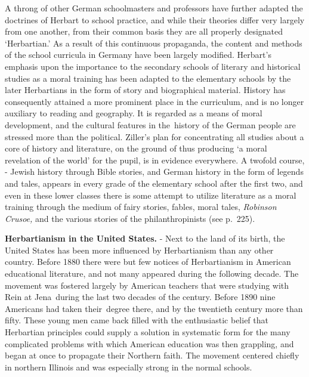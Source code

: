 \documentclass[]{book}
\begin{document}
A throng of other German schoolmasters and professors have further adapted the doctrines of Herbart to school practice, and while their theories differ very largely from one another, from their common basis they are all properly designated `Herbartian.' As a result of this continuous propaganda, the content and methods of the school curricula in Germany have been largely modified. Herbart's emphasis upon the importance to the secondary schools of literary and historical studies as a moral training has been adapted to the elementary schools by the later Herbartians in the form of story and biographical material. History has consequently attained a more prominent place in the curriculum, and is no longer auxiliary to reading and geography. It is regarded as a means of moral development, and the cultural features in the~history of the German people are stressed more than the political. Ziller's plan for concentrating all studies about a core of history and literature, on the ground of thus producing `a moral revelation of the world' for the pupil, is in evidence everywhere. A twofold course, - Jewish history through Bible stories, and German history in the form of legends and tales, appears in every grade of the elementary school after the first two, and even in these lower classes there is some attempt to utilize literature as a moral training through the medium of fairy stories, fables, moral tales, \emph{Robinson Crusoe,} and the various stories of the philanthropinists (see p.~225).

\textbf{Herbartianism in the United States.} - Next to the land of its birth, the United States has been more influenced by Herbartianism than any other country. Before 1880 there were but few notices of Herbartianism in American educational literature, and not many appeared during the following decade. The movement was fostered largely by American teachers that were studying with Rein at Jena~during the last two decades of the century. Before 1890 nine Americans had taken their~degree there, and by the twentieth century more than fifty. These young men came back filled with the enthusiastic belief that Herbartian principles could supply a solution in systematic form for the many complicated problems with which American education was then grappling, and began at once to propagate their Northern faith. The movement centered chiefly in northern Illinois and was especially strong in the normal schools.
\end{document}

